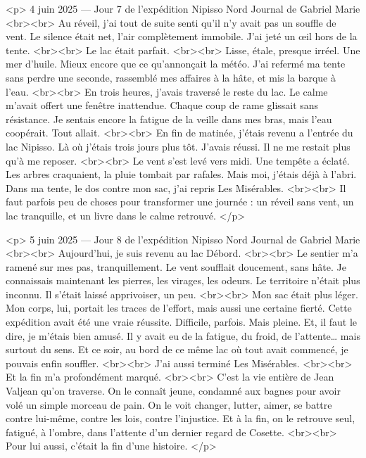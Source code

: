 <p>
4 juin 2025 — Jour 7 de l’expédition Nipisso Nord
Journal de Gabriel Marie
<br><br>
Au réveil, j’ai tout de suite senti qu’il n’y avait pas un souffle de vent. Le silence était net, l’air complètement immobile. J’ai jeté un œil hors de la tente.
<br><br>
Le lac était parfait.
<br><br>
Lisse, étale, presque irréel. Une mer d’huile. Mieux encore que ce qu’annonçait la météo. J’ai refermé ma tente sans perdre une seconde, rassemblé mes affaires à la hâte, et mis la barque à l’eau.
<br><br>
En trois heures, j’avais traversé le reste du lac. Le calme m’avait offert une fenêtre inattendue. Chaque coup de rame glissait sans résistance. Je sentais encore la fatigue de la veille dans mes bras, mais l’eau coopérait. Tout allait.
<br><br>
En fin de matinée, j’étais revenu a l’entrée du lac Nipisso. Là où j’étais trois jours plus tôt. J’avais réussi. Il ne me restait plus qu’à me reposer.
<br><br>
Le vent s’est levé vers midi. Une tempête a éclaté. Les arbres craquaient, la pluie tombait par rafales. Mais moi, j’étais déjà à l’abri. Dans ma tente, le dos contre mon sac, j’ai repris Les Misérables.
<br><br>
Il faut parfois peu de choses pour transformer une journée : un réveil sans vent, un lac tranquille, et un livre dans le calme retrouvé.
</p>






<p>
5 juin 2025 — Jour 8 de l’expédition Nipisso Nord
Journal de Gabriel Marie
<br><br>
Aujourd’hui, je suis revenu au lac Débord.
<br><br>
Le sentier m’a ramené sur mes pas, tranquillement. Le vent soufflait doucement, sans hâte. Je connaissais maintenant les pierres, les virages, les odeurs. Le territoire n’était plus inconnu. Il s’était laissé apprivoiser, un peu.
<br><br>
Mon sac était plus léger. Mon corps, lui, portait les traces de l’effort, mais aussi une certaine fierté. Cette expédition avait été une vraie réussite. Difficile, parfois. Mais pleine. Et, il faut le dire, je m’étais bien amusé. Il y avait eu de la fatigue, du froid, de l’attente… mais surtout du sens. Et ce soir, au bord de ce même lac où tout avait commencé, je pouvais enfin souffler.
<br><br>
J’ai aussi terminé Les Misérables.
<br><br>
Et la fin m’a profondément marqué.
<br><br>
C’est la vie entière de Jean Valjean qu’on traverse. On le connaît jeune, condamné aux bagnes pour avoir volé un simple morceau de pain. On le voit changer, lutter, aimer, se battre contre lui-même, contre les lois, contre l’injustice. Et à la fin, on le retrouve seul, fatigué, à l’ombre, dans l’attente d’un dernier regard de Cosette.
<br><br>
Pour lui aussi, c’était la fin d’une histoire.
</p>










